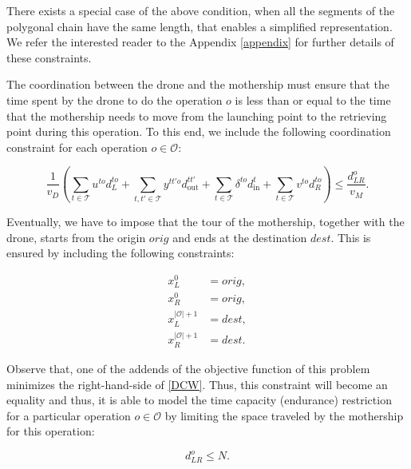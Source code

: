 \documentclass{itor}
\theoremstyle{definition}
\theoremstyle{remark}
\begin{document}
There exists a special case of the above condition, when all the segments of the polygonal chain have the same length, that enables a simplified representation. We refer the interested reader to the Appendix \ref{appendix} for further details of these constraints.


The coordination between the drone and the mothership must ensure that the time spent by the drone to do the operation $o$ is less than or equal to the time that the mothership needs to move from the launching point to the retrieving point during this operation. To this end, we include the following coordination constraint for each operation $o\in \mathcal O$:

\begin{equation}\tag{DCW}\label{DCW}
\frac{1}{v_D}\left(\sum_{t\in \mathcal T} u^{to}d_L^{to} + \sum_{t, t'\in \mathcal T}y^{tt'o}d_{\text{out}}^{tt'} + \sum_{t\in\mathcal T} \delta^{to}d_{\text{in}}^{t} + \sum_{t\in \mathcal T} v^{to}d_R^{to}\right) \leq \frac{d_{LR}^o}{v_M}.
\end{equation}

\noindent
Eventually, we have to impose that the tour of the mothership, together with the drone, starts from the origin $orig$ and ends at the destination $dest$. This is ensured by including the following constraints:

\begin{align*}
x_L^0 & =  orig,  \tag{ORIG$_1$} \label{eq:O1} \\
x_R^0 & =  orig,  \tag{ORIG$_2$} \label{eq:O2} \\
x_L^{|\mathcal{O}|+1} & =  dest,  \tag{DEST$_1$} \label{eq:D1} \\
x_R^{|\mathcal{O}|+1} & =  dest.  \tag{DEST$_2$} \label{eq:D2} 
\end{align*}

Observe that, one of the addends of the objective function of this problem minimizes the right-hand-side of \eqref{DCW}. Thus, this constraint will become an equality and thus, it is able to model the time capacity (endurance) restriction for a particular operation $o\in \mathcal O$ by limiting the space traveled by the mothership for this operation:

\begin{equation}\tag{Capacity}\label{CAP}
    d_{LR}^o \leq N.
\end{equation}




\end{document}
